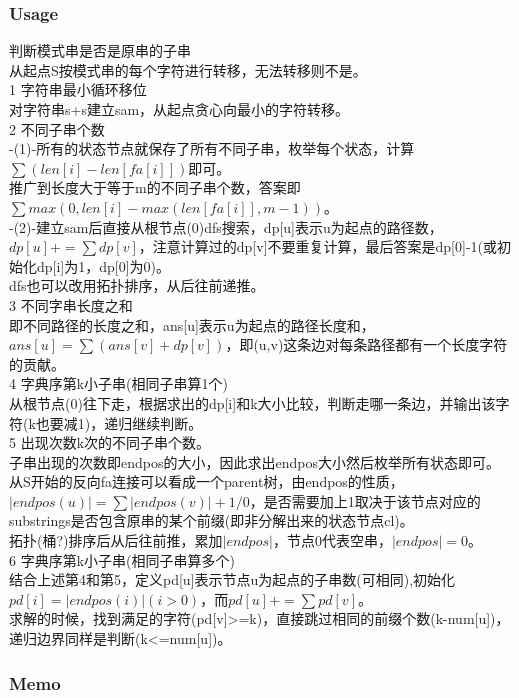 \documentclass[a4paper,12pt]{article}
\begin{document}
\subsubsection{Usage}
\begin{framed}
	 判断模式串是否是原串的子串
	\\ 从起点S按模式串的每个字符进行转移，无法转移则不是。
	\\ 1 字符串最小循环移位
	\\ 对字符串s+s建立sam，从起点贪心向最小的字符转移。
	\\ 2 不同子串个数
	\\ -(1)-所有的状态节点就保存了所有不同子串，枚举每个状态，计算$\sum (len[i]-len[fa[i]])$即可。
	\\ 推广到长度大于等于m的不同子串个数，答案即$\sum max(0,len[i]-max(len[fa[i]],m-1))$。
	\\ -(2)-建立sam后直接从根节点(0)dfs搜索，dp[u]表示u为起点的路径数，$dp[u]+=\sum dp[v]$，注意计算过的dp[v]不要重复计算，最后答案是dp[0]-1(或初始化dp[i]为1，dp[0]为0)。
	\\dfs也可以改用拓扑排序，从后往前递推。
	\\ 3 不同字串长度之和
	\\ 即不同路径的长度之和，ans[u]表示u为起点的路径长度和，$ans[u]=\sum (ans[v]+dp[v])$，即(u,v)这条边对每条路径都有一个长度字符的贡献。
	\\ 4 字典序第k小子串(相同子串算1个)
	\\ 从根节点(0)往下走，根据求出的dp[i]和k大小比较，判断走哪一条边，并输出该字符(k也要减1)，递归继续判断。
	\\ 5 出现次数k次的不同子串个数。
	\\ 子串出现的次数即endpos的大小，因此求出endpos大小然后枚举所有状态即可。
	\\ 从S开始的反向fa连接可以看成一个parent树，由endpos的性质，$|endpos(u)|=\sum |endpos(v)|+1/0$，是否需要加上1取决于该节点对应的substrings是否包含原串的某个前缀(即非分解出来的状态节点cl)。
	\\ 拓扑(桶?)排序后从后往前推，累加$|endpos|$，节点0代表空串，$|endpos|=0$。
	\\ 6 字典序第k小子串(相同子串算多个)
	\\ 结合上述第4和第5，定义pd[u]表示节点u为起点的子串数(可相同),初始化$pd[i]=|endpos(i)|(i>0)$，而$pd[u]+=\sum pd[v]$。
	\\ 求解的时候，找到满足的字符(pd[v]>=k)，直接跳过相同的前缀个数(k-num[u])，递归边界同样是判断(k<=num[u])。
\end{framed}
\subsubsection{Memo}
\inputminted[]{c++}{Template/String/usage/sam-1.cpp}
\end{document}
